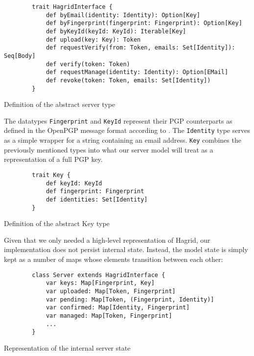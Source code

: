 \begin{code}
    \begin{verbatim}
        trait HagridInterface {
            def byEmail(identity: Identity): Option[Key]
            def byFingerprint(fingerprint: Fingerprint): Option[Key]
            def byKeyId(keyId: KeyId): Iterable[Key]
            def upload(key: Key): Token
            def requestVerify(from: Token, emails: Set[Identity]): Seq[Body]
            def verify(token: Token)
            def requestManage(identity: Identity): Option[EMail]
            def revoke(token: Token, emails: Set[Identity])
        }
        \end{verbatim}
        \caption{Definition of the abstract server type}
        \label{def:HagridInterface}
\end{code}

The datatypes \texttt{Fingerprint} and \texttt{KeyId} represent their PGP counterparts as defined in the OpenPGP message format according to \cite{callas1998openpgp}. The \texttt{Identity} type serves as a simple wrapper for a string containing an email address. \texttt{Key} combines the previously mentioned types into what our server model will treat as a representation of a full PGP key.
\begin{code}
    \begin{verbatim}
        trait Key {
            def keyId: KeyId
            def fingerprint: Fingerprint
            def identities: Set[Identity]
        }
    \end{verbatim}
\caption{Definition of the abstract Key type}
\end{code}

Given that we only needed a high-level representation of Hagrid, our implementation does not persist internal state. Instead, the model state is simply kept as a number of maps whose elements transition between each other: 
\begin{code}
    \begin{verbatim}
        class Server extends HagridInterface {
            var keys: Map[Fingerprint, Key]
            var uploaded: Map[Token, Fingerprint]
            var pending: Map[Token, (Fingerprint, Identity)]
            var confirmed: Map[Identity, Fingerprint]
            var managed: Map[Token, Fingerprint]
            ...
        }
    \end{verbatim} 
    \caption{Representation of the internal server state}
\end{code}



